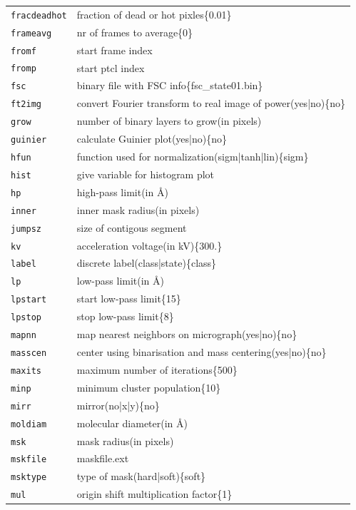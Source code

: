 \documentclass[a4paper,11pt]{article}
\begin{document}
\begin{tabular}{ll}
\texttt{fracdeadhot}&{fraction of dead or hot pixles\{0.01\}}\\
\texttt{frameavg}&{nr of frames to average\{0\}}\\
\texttt{fromf}&{start frame index}\\
\texttt{fromp}&{start ptcl index}\\
\texttt{fsc}&{binary file with FSC info\{fsc\_state01.bin\}}\\
\texttt{ft2img}&{convert Fourier transform to real image of power(yes|no)\{no\}}\\
\texttt{grow}&{number of binary layers to grow(in pixels)}\\
\texttt{guinier}&{calculate Guinier plot(yes|no)\{no\}}\\
\texttt{hfun}&{function used for normalization(sigm|tanh|lin)\{sigm\}}\\
\texttt{hist}&{give variable for histogram plot}\\
\texttt{hp}&{high-pass limit(in \AA{})}\\
\texttt{inner}&{inner mask radius(in pixels)}\\
\texttt{jumpsz}&{size of contigous segment}\\
\texttt{kv}&{acceleration voltage(in kV)\{300.\}}\\
\texttt{label}&{discrete label(class|state)\{class\}}\\
\texttt{lp}&{low-pass limit(in \AA{})}\\
\texttt{lpstart}&{start low-pass limit\{15\}}\\
\texttt{lpstop}&{stop low-pass limit\{8\}}\\
\texttt{mapnn}&{map nearest neighbors on micrograph(yes|no)\{no\}}\\
\texttt{masscen}&{center using binarisation and mass centering(yes|no)\{no\}}\\
\texttt{maxits}&{maximum number of iterations\{500\}}\\
\texttt{minp}&{minimum cluster population\{10\}}\\
\texttt{mirr}&{mirror(no|x|y)\{no\}}\\
\texttt{moldiam}&{molecular diameter(in \AA{})}\\
\texttt{msk}&{mask radius(in pixels)}\\
\texttt{mskfile}&{maskfile.ext}\\
\texttt{msktype}&{type of mask(hard|soft)\{soft\}}\\
\texttt{mul}&{origin shift multiplication factor\{1\}}\\

\end{tabular}
\end{document}
